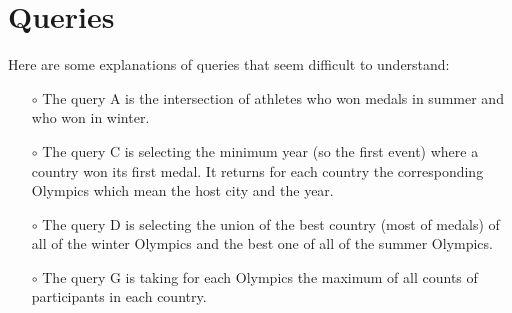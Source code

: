 %
%
%
%

\chapter{Queries}

Here are some explanations of queries that seem difficult to understand:
\begin{itemize}
	\item[$\circ$] The query A is the intersection of athletes who won medals in summer and who won in
	winter.
	\item[$\circ$] The query C is selecting the minimum year (so the first event) where a country won its
first medal. It returns for each country the corresponding Olympics which mean the host
city and the year.
	\item[$\circ$] The query D is selecting the union of the best country (most of medals) of all of the winter
Olympics and the best one of all of the summer Olympics.
	\item[$\circ$] The query G is taking for each Olympics the maximum of all counts of participants in
each country.
\end{itemize}

\begin{center}
	
\end{center}

\begin{center}
	
\end{center}

\begin{center}
	
\end{center}

\begin{center}
	
\end{center}

\begin{center}
	
\end{center}

\begin{center}
	
\end{center}

\begin{center}
	
\end{center}

\begin{center}
	
\end{center}


